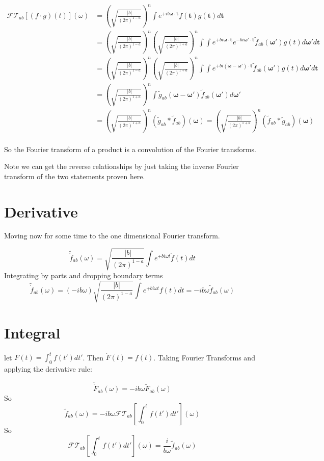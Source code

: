 \documentclass[12pt]{article}
\newcommand{\bv}[1]{\boldsymbol{#1}}
\begin{document}
\begin{align*}
\mathcal{FT}_{ab}[(f\cdot g)(t)](\omega) &= \left(\sqrt{\frac{|b|}{(2\pi)^{1-a}}}\right)^n \int e^{+ib\bv{\omega} \cdot \bv{t}} f(\bv{t}) g(\bv{t}) d\bv{t}\\
&= \left(\sqrt{\frac{|b|}{(2\pi)^{1-a}}}\right)^n \left(\sqrt{\frac{|b|}{(2\pi)^{1+a}}}\right)^n \int \int e^{+bi \bv{\omega} \cdot \bv{t}} e^{-bi \bv{\omega}'\cdot \bv{t}}  \tilde{f}_{ab}(\bv{\omega}') g(t) d\bv{\omega}' d\bv{t}\\
&= \left(\sqrt{\frac{|b|}{(2\pi)^{1-a}}}\right)^n \left(\sqrt{\frac{|b|}{(2\pi)^{1+a}}}\right)^n \int \int e^{+bi (\bv{\omega}-\bv{\omega}') \cdot \bv{t}} \tilde{f}_{ab}(\bv{\omega}') g(t) d\bv{\omega}' d\bv{t}\\
&= \left(\sqrt{\frac{|b|}{(2\pi)^{1+a}}}\right)^n \int \tilde{g}_{ab}(\bv{\omega}-\bv{\omega}')\tilde{f}_{ab}(\bv{\omega}') d\bv{\omega}'\\
&= \left(\sqrt{\frac{|b|}{(2\pi)^{1+a}}}\right)^n \left(\tilde{g}_{ab} \ast \tilde{f}_{ab}\right)(\bv{\omega})
= \left(\sqrt{\frac{|b|}{(2\pi)^{1+a}}}\right)^n \left(\tilde{f}_{ab} \ast \tilde{g}_{ab}\right)(\bv{\omega}) \\
\end{align*}

So the Fourier transform of a product is a convolution of the Fourier transforms.

Note we can get the reverse relationships by just taking the inverse Fourier transform of the two statements proven here.

\section{Derivative}

Moving now for some time to the one dimensional Fourier transform.

\[\tilde{\dot{f}}_{ab}(\omega) = \sqrt{\frac{|b|}{(2\pi)^{1-a}}} \int e^{+bi\omega t}\dot{f}(t)dt\]
Integrating by parts and dropping boundary terms
\[
\tilde{\dot{f}}_{ab}(\omega) = (-ib\omega) \sqrt{\frac{|b|}{(2\pi)^{1-a}}} \int e^{+bi\omega t}f(t)dt = -ib\omega \tilde{f}_{ab}(\omega)
\]
\section{Integral}
let $F(t) = \int_0^{t} f(t') dt'$. Then $\dot{F}(t) = f(t)$. Taking Fourier Transforms and applying the derivative rule:

\[
\tilde{\dot{F}}_{ab}(\omega) = -ib\omega\tilde{F}_{ab}(\omega)
\]
So
\[
\tilde{f}_{ab}(\omega) = -ib\omega \mathcal{FT}_{ab}\left[ \int_0^t f(t')dt'\right](\omega)
\]
So
\[
\mathcal{FT}_{ab}\left[ \int_0^t f(t')dt'\right](\omega) = \frac{i}{b\omega} \tilde{f}_{ab}(\omega)
\]
\end{document}

